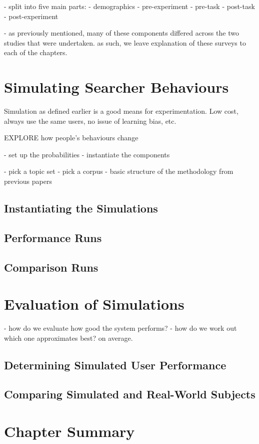 - split into five main parts:
    - demographics
    - pre-experiment
    - pre-task
    - post-task
    - post-experiment

- as previously mentioned, many of these components differed across the two studies that were undertaken. as such, we leave explanation of these surveys to each of the chapters.

\section{Simulating Searcher Behaviours}\label{chap:csm:method:simulation}
Simulation as defined earlier is a good means for experimentation.
Low cost, always use the same users, no issue of learning bias, etc.

EXPLORE how people's behaviours change

- set up the probabilities
- instantiate the components

- pick a topic set
- pick a corpus
- basic structure of the methodology from previous papers

\subsection{Instantiating the Simulations}

\subsection{Performance Runs}

\subsection{Comparison Runs}

\section{Evaluation of Simulations}\label{chap:csm:method:evaluation}
- how do we evaluate how good the system performs?
- how do we work out which one approximates best? on average.

\subsection{Determining Simulated User Performance}

\subsection{Comparing Simulated and Real-World Subjects}

\section{Chapter Summary}
